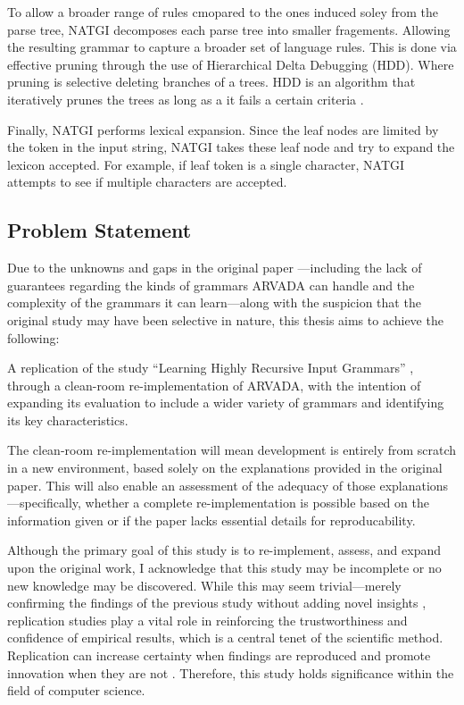 \vspace{\baselineskip}
To allow a broader range of rules cmopared to the ones induced soley from the parse tree, NATGI decomposes each parse tree into smaller fragements. Allowing the resulting grammar to capture a broader set of language rules. This is done via effective pruning through the use of Hierarchical Delta Debugging (HDD). Where pruning is selective deleting branches of a trees. HDD is an algorithm that iteratively prunes the trees as long as a it fails a certain criteria \cite{misherghiHDDHierarchicalDelta2006a}. 

\vspace{\baselineskip}
Finally, NATGI performs lexical expansion. Since the leaf nodes are limited by the token in the input string, NATGI takes these leaf node and try to expand the lexicon accepted. For example, if leaf token is a single character, NATGI attempts to see if multiple characters are accepted.


\subsection{Problem Statement}

Due to the unknowns and gaps in the original paper \cite{kulkarniLearningHighlyRecursive2021}—including the lack of guarantees regarding the kinds of grammars ARVADA can handle and the complexity of the grammars it can learn—along with the suspicion that the original study may have been selective in nature, this thesis aims to achieve the following:

\vspace{\baselineskip}
A replication of the study “Learning Highly Recursive Input Grammars” \cite{kulkarniLearningHighlyRecursive2021}, through a clean-room re-implementation of ARVADA, with the intention of expanding its evaluation to include a wider variety of grammars and identifying its key characteristics.

\vspace{\baselineskip}
The clean-room re-implementation will mean development is entirely from scratch in a new environment, based solely on the explanations provided in the original paper. This will also enable an assessment of the adequacy of those explanations—specifically, whether a complete re-implementation is possible based on the information given or if the paper lacks essential details for reproducability.

\vspace{\baselineskip}
Although the primary goal of this study is to re-implement, assess, and expand upon the original work, I acknowledge that this study may be incomplete or no new knowledge may be discovered. While this may seem trivial—merely confirming the findings of the previous study without adding novel insights \cite{hendriksConsiderItParsed}, replication studies play a vital role in reinforcing the trustworthiness and confidence of empirical results, which is a central tenet of the scientific method. Replication can increase certainty when findings are reproduced and promote innovation when they are not \cite{shepperdReplicationStudiesConsidered2018}. Therefore, this study holds significance within the field of computer science.

